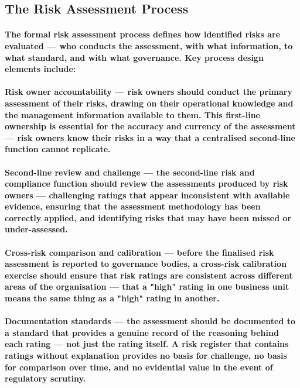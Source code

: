 \subsection{The Risk Assessment Process}
\paragraph{The formal risk assessment process defines how identified risks are evaluated — who conducts the assessment, with what information, to what standard, and with what governance. Key process design elements include:}
\paragraph{\textbf{Risk owner accountability} — risk owners should conduct the primary assessment of their risks, drawing on their operational knowledge and the management information available to them. This first-line ownership is essential for the accuracy and currency of the assessment — risk owners know their risks in a way that a centralised second-line function cannot replicate.}
\paragraph{\textbf{Second-line review and challenge} — the second-line risk and compliance function should review the assessments produced by risk owners — challenging ratings that appear inconsistent with available evidence, ensuring that the assessment methodology has been correctly applied, and identifying risks that may have been missed or under-assessed.}
\paragraph{\textbf{Cross-risk comparison and calibration} — before the finalised risk assessment is reported to governance bodies, a cross-risk calibration exercise should ensure that risk ratings are consistent across different areas of the organisation — that a "high" rating in one business unit means the same thing as a "high" rating in another.}
\paragraph{\textbf{Documentation standards} — the assessment should be documented to a standard that provides a genuine record of the reasoning behind each rating — not just the rating itself. A risk register that contains ratings without explanation provides no basis for challenge, no basis for comparison over time, and no evidential value in the event of regulatory scrutiny.}

